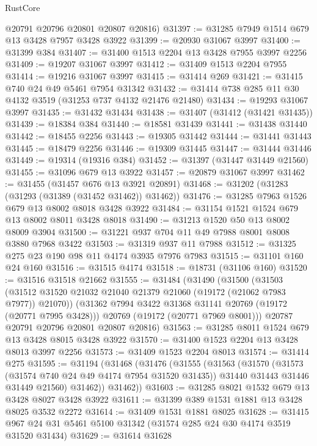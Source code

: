 \begin{lexlean}{RustCore}
\begin{coremodule}
      @20791
      @20796
      @20801
      @20807
      @20816)
@31397 := @31285 @7949 @1514 @679 @13 @3428 @7957 @3428 @3922
@31399 := @20930 @31067 @3997
@31400 := @31399 @384
@31407 := @31400 @1513 @2204 @13 @3428 @7955 @3997 @2256
@31409 := @19207 @31067 @3997
@31412 := @31409 @1513 @2204 @7955
@31414 := @19216 @31067 @3997
@31415 := @31414 @269
@31421 := @31415 @740 @24 @49 @5461 @7954 @31342
@31432 := @31414 @738 @285 @11 @30 @4132 @3519 (@31253 @737 @4132 @21476 @21480)
@31434 := @19293 @31067 @3997
@31435 := @31432 @31434
@31438 := @31407 (@31412 (@31421 @31435))
@31439 := @18384 @384
@31440 := @18581 @31439
@31441 := @31438 @31440
@31442 := @18455 @2256
@31443 := @19305 @31442
@31444 := @31441 @31443
@31445 := @18479 @2256
@31446 := @19309 @31445
@31447 := @31444 @31446
@31449 := @19314 (@19316 @384)
@31452 := @31397 (@31447 @31449 @21560)
@31455 := @31096 @679 @13 @3922
@31457 := @20879 @31067 @3997
@31462 := @31455 (@31457 @676 @13 @3921 @20891)
@31468 := @31202 (@31283 (@31293 (@31389 (@31452 @31462)) @31462))
@31476 := @31285 @7963 @1526 @679 @13 @8002 @8018 @3428 @3922
@31484 := @31154 @1521 @1524 @679 @13 @8002 @8011 @3428 @8018
@31490 := @31213 @1520 @50 @13 @8002 @8009 @3904
@31500 := @31221 @937 @704 @11 @49 @7988 @8001 @8008 @3880 @7968 @3422
@31503 := @31319 @937 @11 @7988
@31512 := @31325 @275 @23 @190 @98 @11 @4174 @3935 @7976 @7983
@31515 := @31101 @160 @24 @160
@31516 := @31515 @4174
@31518 := @18731 (@31106 @160)
@31520 := @31516 @31518 @21662
@31555 := @31484
    (@31490
      (@31500
        (@31503 (@31512 @31520 @21032 @21040 @21379 @21060 (@19172 (@21062 @7983 @7977)) @21070))
        (@31362 @7994 @3422 @31368 @31141 @20769 (@19172 (@20771 @7995 @3428)))
        @20769
        (@19172 (@20771 @7969 @8001)))
      @20787
      @20791
      @20796
      @20801
      @20807
      @20816)
@31563 := @31285 @8011 @1524 @679 @13 @3428 @8015 @3428 @3922
@31570 := @31400 @1523 @2204 @13 @3428 @8013 @3997 @2256
@31573 := @31409 @1523 @2204 @8013
@31574 := @31414 @275
@31595 := @31194
    (@31468
      (@31476
        (@31555
          (@31563
            (@31570
              (@31573 (@31574 @740 @24 @49 @4174 @7954 @31520 @31435))
              @31440
              @31443
              @31446
              @31449
              @21560)
            @31462))
        @31462))
@31603 := @31285 @8021 @1532 @679 @13 @3428 @8027 @3428 @3922
@31611 := @31399 @389 @1531 @1881 @13 @3428 @8025 @3532 @2272
@31614 := @31409 @1531 @1881 @8025
@31628 := @31415 @967 @24 @31 @5461 @5100 @31342 (@31574 @285 @24 @30 @4174 @3519 @31520 @31434)
@31629 := @31614 @31628

\end{coremodule}
\end{lexlean}
